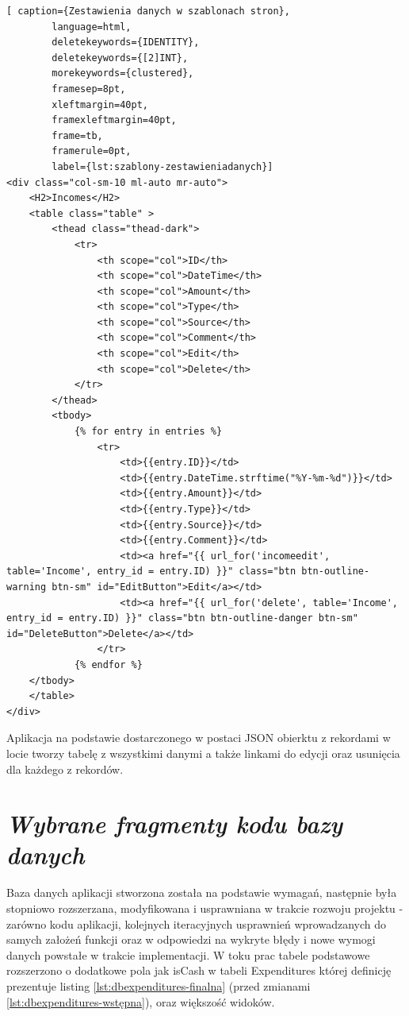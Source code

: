 \documentclass[a4paper,10pt, twoside]{report}
\newcommand{\customstylesection}[1]{\textbf{\textit{#1}}}
\begin{document}
\begin{large}
\begin{minipage}{\textwidth}
    \begin{lstlisting}[ caption={Zestawienia danych w szablonach stron},
        language=html,
        deletekeywords={IDENTITY},
        deletekeywords={[2]INT},
        morekeywords={clustered},
        framesep=8pt,
        xleftmargin=40pt,
        framexleftmargin=40pt,
        frame=tb,
        framerule=0pt,
        label={lst:szablony-zestawieniadanych}]
<div class="col-sm-10 ml-auto mr-auto">
    <H2>Incomes</H2>
    <table class="table" >
        <thead class="thead-dark">
            <tr>
                <th scope="col">ID</th>
                <th scope="col">DateTime</th>
                <th scope="col">Amount</th>
                <th scope="col">Type</th>
                <th scope="col">Source</th>
                <th scope="col">Comment</th>
                <th scope="col">Edit</th>
                <th scope="col">Delete</th>
            </tr>
        </thead>
        <tbody>
            {% for entry in entries %}
                <tr>
                    <td>{{entry.ID}}</td>
                    <td>{{entry.DateTime.strftime("%Y-%m-%d")}}</td>
                    <td>{{entry.Amount}}</td>
                    <td>{{entry.Type}}</td>
                    <td>{{entry.Source}}</td>
                    <td>{{entry.Comment}}</td>
                    <td><a href="{{ url_for('incomeedit', table='Income', entry_id = entry.ID) }}" class="btn btn-outline-warning btn-sm" id="EditButton">Edit</a></td>
                    <td><a href="{{ url_for('delete', table='Income', entry_id = entry.ID) }}" class="btn btn-outline-danger btn-sm" id="DeleteButton">Delete</a></td>
                </tr>
            {% endfor %}
    </tbody>
    </table>
</div>\end{lstlisting}
{Aplikacja na podstawie dostarczonego w postaci JSON obierktu z rekordami w 
locie tworzy tabelę z wszystkimi danymi a także linkami do edycji oraz usunięcia
 dla każdego z rekordów.}
\end{minipage}


\section{\customstylesection{Wybrane fragmenty kodu bazy danych}}
{Baza danych aplikacji stworzona została na podstawie wymagań, następnie była 
stopniowo rozszerzana, modyfikowana i usprawniana w trakcie rozwoju projektu - 
zarówno kodu aplikacji, kolejnych iteracyjnych usprawnień wprowadzanych do 
samych założeń funkcji oraz w odpowiedzi na wykryte błędy i nowe wymogi danych 
powstałe w trakcie implementacji. W toku prac tabele podstawowe rozszerzono 
o dodatkowe pola jak isCash w tabeli Expenditures której definicję prezentuje 
listing \ref*{lst:dbexpenditures-finalna} (przed zmianami 
\ref*{lst:dbexpenditures-wstępna}), oraz większość widoków.}


\end{large}
\end{document}
